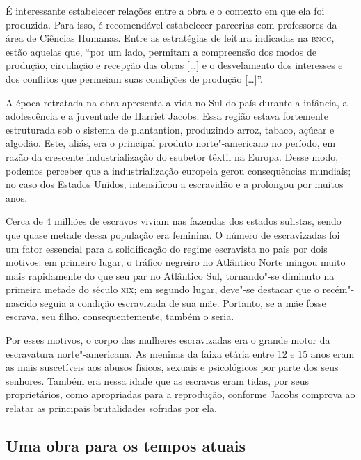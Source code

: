 \documentclass[11pt]{extarticle}
\begin{document}
É interessante estabelecer relações entre a obra e o contexto em que ela
foi produzida. Para isso, é recomendável estabelecer parcerias com
professores da área de Ciências Humanas. Entre as estratégias de leitura
indicadas na \textsc{bncc}, estão aquelas que, ``por um lado, permitam a
compreensão dos modos de produção, circulação e recepção das obras
{[}\ldots{}{]} e o desvelamento dos interesses e dos conflitos que permeiam
suas condições de produção {[}\ldots{}{]}''.

A época retratada na obra apresenta a vida no Sul do país durante a
infância, a adolescência e a juventude de Harriet Jacobs. Essa região
estava fortemente estruturada sob o sistema de plantantion, produzindo
arroz, tabaco, açúcar e algodão. Este, aliás, era o principal produto
norte"-americano no período, em razão da crescente industrialização do
ssubetor têxtil na Europa. Desse modo, podemos perceber que a
industrialização europeia gerou consequências mundiais; no caso dos
Estados Unidos, intensificou a escravidão e a prolongou por muitos anos.

Cerca de 4 milhões de escravos viviam nas fazendas dos estados sulistas,
sendo que quase metade dessa população era feminina. O número de
escravizadas foi um fator essencial para a solidificação do regime
escravista no país por dois motivos: em primeiro lugar, o tráfico
negreiro no Atlântico Norte mingou muito mais rapidamente do que seu par
no Atlântico Sul, tornando"-se diminuto na primeira metade do século \textsc{xix};
em segundo lugar, deve"-se destacar que o recém"-nascido seguia a condição
escravizada de sua mãe. Portanto, se a mãe fosse escrava, seu filho,
consequentemente, também o seria.

Por esses motivos, o corpo das mulheres escravizadas era o grande motor
da escravatura norte"-americana. As meninas da faixa etária entre 12 e 15
anos eram as mais suscetíveis aos abusos físicos, sexuais e psicológicos
por parte dos seus senhores. Também era nessa idade que as escravas eram
tidas, por seus proprietários, como apropriadas para a reprodução,
conforme Jacobs comprova ao relatar as principais brutalidades sofridas
por ela.




\subsection{Uma obra para os tempos atuais}
\end{document}
